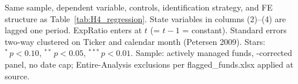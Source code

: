 \begin{table}[!htbp]
\begin{minipage}{\tabletempwidth}
\fi
\par\medskip
\begin{singlespace}\tablefont\noindent
Same sample, dependent variable, controls, identification strategy, and FE structure as Table~\ref{tab:H4_regression}. State variables in columns (2)--(4) are lagged one period. ExpRatio enters at $t$ (= $t-1$ = constant). Standard errors two-way clustered on Ticker and calendar month (Petersen 2009). Stars: $^{*}\,p<0.10$, $^{**}\,p<0.05$, $^{***}\,p<0.01$. Sample: actively managed funds, \textcite{Evans2010}-corrected panel, no date cap; Entire-Analysis exclusions per flagged\_funds.xlsx applied at source.
\end{singlespace}
\end{minipage}
\end{table}

